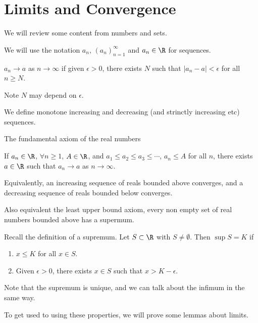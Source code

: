 \documentclass[a4paper]{scrreprt}
\begin{document}
\chapter{Limits and Convergence}

We will review some content from numbers and sets.

We will use the notation $a_n$, $(a_n)_{n = 1}^{\infty}$ and $a_n \in \R$ for sequences.

\begin{definition}
	$a_n \rightarrow a$ as $n \rightarrow \infty$ if given $\epsilon > 0$, there exists $N$ such that $|a_n - a| < \epsilon$ for all $n \geq N$.
\end{definition}

Note $N$ may depend on $\epsilon$.

We define monotone increasing and decreasing (and strinctly increasing etc) sequences. 

The fundamental axiom of the real numbers

If $a_n \in \R$, $\forall n \geq 1$, $A \in \R$, and $a_1 \leq a_2 \leq a_3 \leq \cdots$, $a_n \leq A$ for all $n$, there exists $a \in \R$ such that $a_n \rightarrow a$ as $n \rightarrow \infty$.

Equivalently, an increasing sequence of reals bounded above converges, and a decreasing sequence of reals bounded below converges.

Also equivalent the least upper bound axiom, every non empty set of real numbers bounded above has a supermum.

Recall the definition of a supremum. Let $S \subset \R$ with $S \neq \emptyset$. Then $\sup S = K$ if
\begin{enumerate}[label=(\roman*)]
	\item $x \leq K$ for all $x \in S$.
	\item Given $\epsilon > 0$, there exists $x \in S$ such that $x > K - \epsilon$.
\end{enumerate}

Note that the supremum is unique, and we can talk about the infimum in the same way.

To get used to using these properties, we will prove some lemmas about limits.
\end{document}
